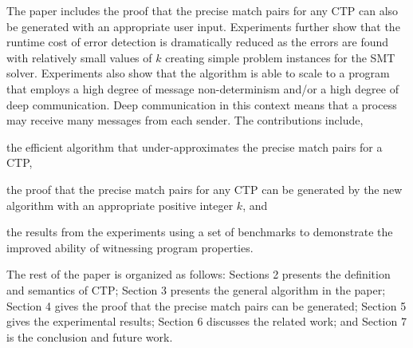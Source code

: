 The paper includes the proof that the precise match pairs for any CTP can also be generated with an appropriate user input. 
Experiments further show that the runtime cost of error detection is dramatically reduced as the errors are found with relatively small values of $k$ creating simple problem instances for the SMT solver. 
Experiments also show that the algorithm is able to scale to a program that employs a high degree of message non-determinism and/or a high degree of deep communication.
Deep communication in this context means that a process may receive many messages from each sender.
The contributions include,
\begin{compactitem}
\item the efficient algorithm that under-approximates the precise match pairs for a CTP, 
\item the proof that the precise match pairs for any CTP can be generated by the new algorithm with an appropriate positive integer $k$, and
\item the results from the experiments using a set of benchmarks to demonstrate the improved ability of witnessing program properties.
\end{compactitem}

The rest of the paper is organized as follows: 
Sections 2 presents the definition and semantics of CTP; Section 3 presents the general algorithm in the paper; Section 4 gives the proof that the precise match pairs can be generated; Section 5 gives the experimental results; Section 6 discusses the related work; and Section 7 is the conclusion and future work.

